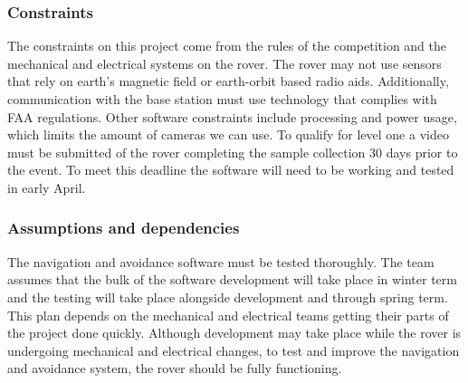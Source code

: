 \documentclass[10pt, oneside,onecolumn]{IEEEtran}
\begin{document}
\subsubsection{Constraints}
The constraints on this project come from the rules of the competition and the mechanical and electrical systems on the rover. The rover may not use sensors that rely on earth's magnetic field or earth-orbit based radio aids. Additionally, communication with the base station must use technology that complies with FAA regulations. Other software constraints include processing and power usage, which limits the amount of cameras we can use. To qualify for level one a video must be submitted of the rover completing the sample collection 30 days prior to the event. To meet this deadline the software will need to be working and tested in early April. 

\subsubsection{Assumptions and dependencies}
The navigation and avoidance software must be tested thoroughly. The team assumes that the bulk of the software development will take place in winter term and the testing will take place alongside development and through spring term. This plan depends on the mechanical and electrical teams getting their parts of the project done quickly. Although development may take place while the rover is undergoing mechanical and electrical changes, to test and improve the navigation and avoidance system, the rover should be fully functioning. 
\end{document}
